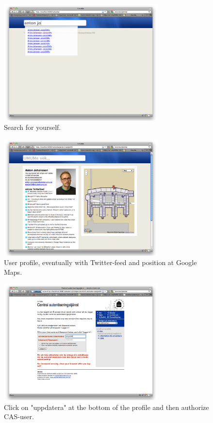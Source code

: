 \documentclass[titlepage, twocolumn, a4paper, 10pt]{article}
\begin{document}
\begin{figure}[H]
  \centering
  \includegraphics[width=3.3in]{images/pic2.png}
  \caption{Search for yourself.}
  \label{fig:images/search}
\end{figure}

\begin{figure}[H]
  \centering
  \includegraphics[width=3.3in]{images/pic3.png}
  \caption{User profile, eventually with Twitter-feed and position at Google Maps.}
  \label{fig:images/person}
\end{figure}

\begin{figure}[H]
  \centering
  \includegraphics[width=3.3in]{images/pic4.png}
  \caption{Click on "uppdatera" at the bottom of the profile and then authorize CAS-user.}
  \label{fig:images/cas}
\end{figure}
\end{document}

